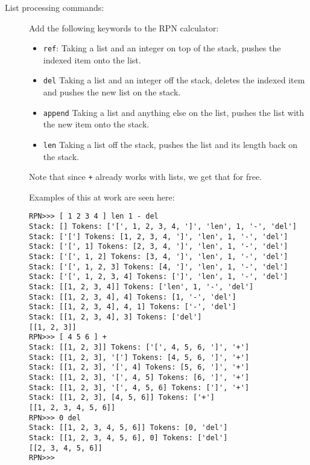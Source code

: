 \documentclass[12pt]{article}
\begin{document}
\begin{description}
\item[List processing commands:]

Add the following keywords to the RPN calculator:
\begin{itemize}
\item \lstinline{ref}:  Taking a list and
an integer on top of the stack, pushes the
indexed item onto the list.
\item \lstinline{del}
Taking a list and an integer off the stack,
deletes the indexed item and pushes the new
list on the stack.
\item \lstinline{append}
Taking a list and anything else on the list,
pushes the list with the new item onto the stack.
\item \lstinline{len}
Taking a list off the stack, pushes the
list and its length back on the stack.
\end{itemize}

Note that since \lstinline{+} already works 
with lists, we get that for free.

Examples of this at work are seen here:
\begin{lstlisting}
RPN>>> [ 1 2 3 4 ] len 1 - del
Stack: [] Tokens: ['[', 1, 2, 3, 4, ']', 'len', 1, '-', 'del']
Stack: ['['] Tokens: [1, 2, 3, 4, ']', 'len', 1, '-', 'del']
Stack: ['[', 1] Tokens: [2, 3, 4, ']', 'len', 1, '-', 'del']
Stack: ['[', 1, 2] Tokens: [3, 4, ']', 'len', 1, '-', 'del']
Stack: ['[', 1, 2, 3] Tokens: [4, ']', 'len', 1, '-', 'del']
Stack: ['[', 1, 2, 3, 4] Tokens: [']', 'len', 1, '-', 'del']
Stack: [[1, 2, 3, 4]] Tokens: ['len', 1, '-', 'del']
Stack: [[1, 2, 3, 4], 4] Tokens: [1, '-', 'del']
Stack: [[1, 2, 3, 4], 4, 1] Tokens: ['-', 'del']
Stack: [[1, 2, 3, 4], 3] Tokens: ['del']
[[1, 2, 3]]
RPN>>> [ 4 5 6 ] +
Stack: [[1, 2, 3]] Tokens: ['[', 4, 5, 6, ']', '+']
Stack: [[1, 2, 3], '['] Tokens: [4, 5, 6, ']', '+']
Stack: [[1, 2, 3], '[', 4] Tokens: [5, 6, ']', '+']
Stack: [[1, 2, 3], '[', 4, 5] Tokens: [6, ']', '+']
Stack: [[1, 2, 3], '[', 4, 5, 6] Tokens: [']', '+']
Stack: [[1, 2, 3], [4, 5, 6]] Tokens: ['+']
[[1, 2, 3, 4, 5, 6]]
RPN>>> 0 del
Stack: [[1, 2, 3, 4, 5, 6]] Tokens: [0, 'del']
Stack: [[1, 2, 3, 4, 5, 6], 0] Tokens: ['del']
[[2, 3, 4, 5, 6]]
RPN>>> 
\end{lstlisting}

\end{description}
\end{document}
